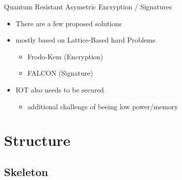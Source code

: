 \documentclass[ucs,10pt]{beamer}
\begin{document}
\begin{frame}{Quantum Resistant Asymetric Encryption / Signatures}

  \begin{itemize}
  \item There are a few proposed solutions
    
  \item mostly based on Lattice-Based hard Problems
    \begin{itemize}
    \item Frodo-Kem (Encryption)
    \item FALCON (Signature)
    \end{itemize}
   
  \item IOT also needs to be secured
  \begin{itemize}
    \item additional challenge of beeing low power/memory
    \end{itemize}
  \end{itemize}
\end{frame}


\section{Structure}
\subsection{Skeleton}
\end{document}
